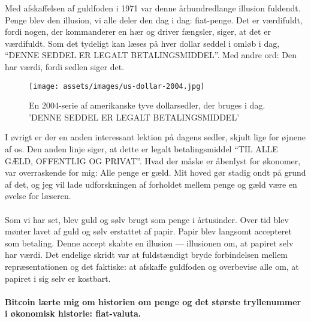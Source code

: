 Med afskaffelsen af guldfoden i 1971 var denne århundredlange
illusion fuldendt. Penge blev den illusion, vi alle deler den dag i dag: 
fiat-penge. Det er værdifuldt, fordi nogen, der kommanderer en hær og driver 
fængsler, siger, at det er værdifuldt. Som det tydeligt kan læses på hver 
dollar seddel i omløb i dag, \enquote{DENNE SEDDEL ER LEGALT BETALINGSMIDDEL}. 
Med andre ord: Den har værdi, fordi sedlen siger det.

\begin{figure}[htbp]
  \centering
  \texttt{[image: assets/images/us-dollar-2004.jpg]}
  \caption{En 2004-serie af amerikanske tyve dollarsedler, der 
  bruges i dag. 'DENNE SEDDEL ER LEGALT BETALINGSMIDDEL'}
  \label{fig:us-dollar-2004}
\end{figure}
  
I øvrigt er der en anden interessant lektion på dagens sedler,
skjult lige for øjnene af os. Den anden linje siger, at dette er legalt 
betalingsmiddel \enquote{TIL ALLE GÆLD, OFFENTLIG OG PRIVAT}. Hvad der måske 
er åbenlyst for økonomer, var overraskende for mig: Alle penge er gæld. Mit 
hoved gør stadig ondt på grund af det, og jeg vil lade udforskningen af 
forholdet mellem penge og gæld være en øvelse for læseren.

\paragraph{}
Som vi har set, blev guld og sølv brugt som penge i årtusinder. Over tid
blev mønter lavet af guld og sølv erstattet af papir. Papir
blev langsomt accepteret som betaling. Denne accept skabte en
illusion --- illusionen om, at papiret selv har værdi. Det endelige
skridt var at fuldstændigt bryde forbindelsen mellem repræsentationen og
det faktiske: at afskaffe guldfoden og overbevise alle om, at
papiret i sig selv er kostbart.

\paragraph{Bitcoin lærte mig om historien om penge og det største tryllenummer
i økonomisk historie: fiat-valuta.}

%
%
%
%
